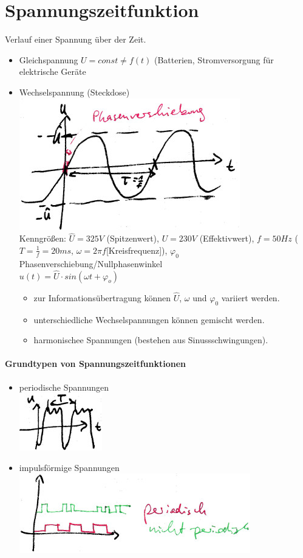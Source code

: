 \section{Spannungszeitfunktion}
Verlauf einer Spannung über der Zeit.
\begin{itemize}
\item Gleichspannung $U= const \not = f(t)$ (Batterien, Stromversorgung für elektrische Geräte
\item Wechselspannung (Steckdose)\\
\includegraphics[scale=1.5]{Abbildungen/ABB403}\\
Kenngrößen: $\hat{U}=325V$ (Spitzenwert), $U=230V$ (Effektivwert), $f=50Hz$ ($T=\frac{1}{f}=20ms$, $\omega = 2 \pi f$[Kreisfrequenz]), $\varphi_0$ Phasenverschiebung/Nullphasenwinkel\\
$u(t)=\hat{U}\cdot sin(\omega t+\varphi_o)$
\begin{itemize}
\item zur Informationsübertragung können $\hat{U}$, $\omega$ und $\varphi_0$ variiert werden.
\item unterschiedliche Wechselspannungen können gemischt werden.
\item harmonischee Spannungen (bestehen aus Sinussschwingungen).
\end{itemize}
\end{itemize}

\paragraph{Grundtypen von Spannungszeitfunktionen}
\begin{itemize}
\item periodische Spannungen\\
\includegraphics[scale=1.5]{Abbildungen/ABB404}
\item impulsförmige Spannungen\\
\includegraphics[scale=1.5]{Abbildungen/ABB405}
\end{itemize}

